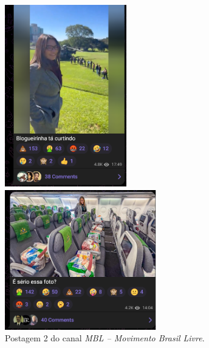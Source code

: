 \documentclass[portuguese]{textolivre}
\begin{document}
\begin{figure}[h!]
\begin{minipage}[t]{0.3\textwidth}
        \includegraphics[width=\linewidth]{Imagens/Fig19.png}
        \caption{Postagem 2 do canal \emph{MBL -- Movimento Brasil Livre}.}
        \label{fig-19}
    \end{minipage}
    \hfill
    \begin{minipage}[t]{0.3\textwidth}
        \centering
        \includegraphics[width=\linewidth]{Imagens/Fig20.png}

\end{minipage}
\end{figure}
\end{document}
